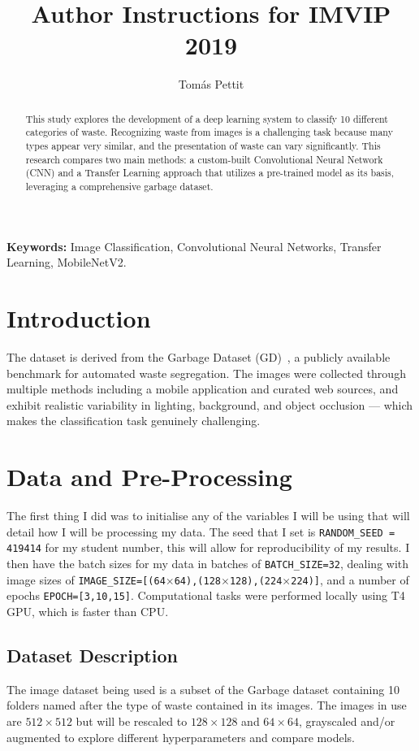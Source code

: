 \documentclass[a4paper,11pt]{article}
\begin{document}
\title{Author Instructions for IMVIP 2019}

\author{Tomás Pettit}
\date{}
\maketitle
\thispagestyle{empty}

\begin{abstract}
This study explores the development of a deep learning system to classify 10 different categories of waste. Recognizing waste from images is a challenging task because many types appear very similar, and the presentation of waste can vary significantly. This research compares two main methods: a custom-built Convolutional Neural Network (CNN) and a Transfer Learning approach that utilizes a pre-trained model as its basis, leveraging a comprehensive garbage dataset.
\end{abstract}
\textbf{Keywords:} Image Classification, Convolutional Neural Networks, Transfer Learning, MobileNetV2.


\section{Introduction}
The dataset is derived from the Garbage Dataset (GD)~\cite{kunwar2026}, a publicly available benchmark for automated waste segregation. The images were collected through multiple methods including a mobile application and curated web sources, and exhibit realistic variability in lighting, background, and object occlusion — which makes the classification task genuinely challenging.

\section{Data and Pre-Processing}
The first thing I did was to initialise any of the variables I will be using that will detail how I will be processing my data. The seed that I set is \texttt{RANDOM\_SEED = 419414} for my student number, this will allow for reproducibility of my results. I then have the batch sizes for my data in batches of \texttt{BATCH\_SIZE=32}, dealing with image sizes of \texttt{IMAGE\_SIZE=[(64$\times$64),(128$\times$128),(224$\times$224)]}, and a number of epochs \texttt{EPOCH=[3,10,15]}. Computational tasks were performed locally using T4 GPU, which is faster than CPU.

\subsection{Dataset Description}
The image dataset being used is a subset of the Garbage dataset containing 10 folders named after the type of waste contained in its images. The images in use are $512\times512$ but will be rescaled to $128\times128$ and $64\times64$, grayscaled and/or augmented to explore different hyperparameters and compare models.
\end{document}
